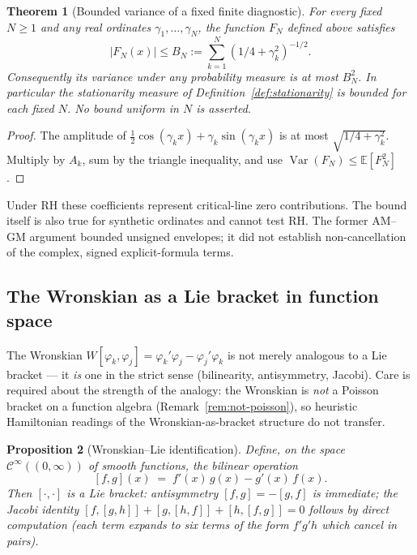 \documentclass[11pt,a4paper]{article}
\theoremstyle{plain}
\newtheorem{theorem}{Theorem}[section]
\newtheorem{proposition}[theorem]{Proposition}
\theoremstyle{definition}
\theoremstyle{remark}
\begin{document}
\begin{theorem}[Bounded variance of a fixed finite diagnostic]\label{thm:FN-acs}\label{thm:T4}
For every fixed $N\ge1$ and any real ordinates $\gamma_1,\ldots,\gamma_N$,
the function $F_N$ defined above satisfies
\[
 |F_N(x)|\le B_N:=\sum_{k=1}^N(1/4+\gamma_k^2)^{-1/2}.
\]
Consequently its variance under any probability measure is at most $B_N^2$.
In particular the stationarity measure of Definition~\ref{def:stationarity}
is bounded for each fixed $N$. No bound uniform in $N$ is asserted.
\end{theorem}
\begin{proof}
The amplitude of $\tfrac12\cos(\gamma_k x)+\gamma_k\sin(\gamma_k x)$
is at most $\sqrt{1/4+\gamma_k^2}$. Multiply by $A_k$, sum by the
triangle inequality, and use $\operatorname{Var}(F_N)\le\mathbb E[F_N^2]$.
\end{proof}
Under RH these coefficients represent critical-line zero contributions.
The bound itself is also true for synthetic ordinates and cannot test RH.
The former AM--GM argument bounded unsigned envelopes; it did not establish
non-cancellation of the complex, signed explicit-formula terms.

\subsection{The Wronskian as a Lie bracket in function space}

The Wronskian $W[\varphi_k, \varphi_j] = \varphi_k'\varphi_j - \varphi_j'\varphi_k$
is not merely analogous to a Lie bracket --- it \emph{is} one in the
strict sense (bilinearity, antisymmetry, Jacobi).  Care is required
about the strength of the analogy: the Wronskian is \emph{not} a
Poisson bracket on a function algebra (Remark~\ref{rem:not-poisson}),
so heuristic Hamiltonian readings of the Wronskian-as-bracket structure
do not transfer.

\begin{proposition}[Wronskian--Lie identification]\label{prop:wronski-lie}
Define, on the space $\mathcal{C}^{\infty}((0,\infty))$ of smooth functions,
the bilinear operation
\[
  [f,g](x) \;=\; f'(x)\,g(x) - g'(x)\,f(x).
\]
Then $[\cdot,\cdot]$ is a Lie bracket:
antisymmetry $[f,g] = -[g,f]$ is immediate; the Jacobi identity
$[f,[g,h]] + [g,[h,f]] + [h,[f,g]] = 0$ follows by direct computation
(each term expands to six terms of the form $f'g'h$ which cancel in pairs).
\end{proposition}
\end{document}
